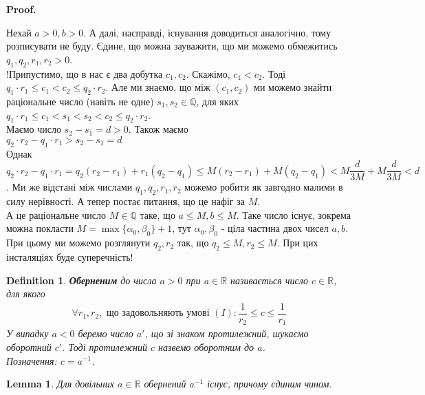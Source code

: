 \documentclass[a4paper, 14pt]{article}
\makeatletter
\def\qed{$\blacksquare$}
\theoremstyle{theoremdd}
\theoremstyle{theoremdd}
\newtheorem{definition}[theorem]{Definition}
\theoremstyle{theoremdd}
\theoremstyle{theoremdd}
\theoremstyle{theoremdd}
\theoremstyle{theoremdd}
\theoremstyle{theoremdd}
\newtheorem{lemma}[theorem]{Lemma}
\theoremstyle{theoremdd}
\renewenvironment{proof}[1][Proof.\\]{\par
\pushQED{\hfill \qed}%
\normalfont \topsep6\p@\@plus6\p@\relax
\trivlist
\item\relax
{\bfseries
#1\@addpunct{.}}\hspace\labelsep\ignorespaces
}{%
\popQED\endtrivlist\@endpefalse
}
\makeatother
\begin{document}
	\begin{proof}
	Нехай $a > 0, b > 0$. А далі, насправді, існування доводиться аналогічно, тому розписувати не буду. Єдине, що можна зауважити, що ми можемо обмежитись $q_1,q_2,r_1,r_2 > 0$.
	\bigskip \\
	!Припустимо, що в нас є два добутка $c_1, c_2$. Скажімо, $c_1 < c_2$. Тоді $q_1 \cdot r_1 \leq c_1 < c_2 \leq q_2 \cdot r_2$. Але ми знаємо, що між $(c_1, c_2)$ ми можемо знайти раціональне число (навіть не одне) $s_1,s_2 \in \mathbb{Q}$, для яких\\
	$q_1 \cdot r_1 \leq c_1 < s_1 < s_2 < c_2 \leq q_2 \cdot r_2$.\\
	Маємо число $s_2 - s_1 = d > 0$. Також маємо\\
	$q_2 \cdot r_2 - q_1 \cdot r_1 > s_2 - s_1 = d$\\
	Однак $q_2 \cdot r_2 - q_1 \cdot r_1 = q_2 (r_2 - r_1) + r_1 (q_2 - q_1) \leq M(r_2 - r_1) + M(q_2 - q_1) < M \dfrac{d}{3M} + M \dfrac{d}{3M} < d$. Ми же відстані між числами $q_1,q_2,r_1,r_2$ можемо робити як завгодно малими в силу нерівності. А тепер постає питання, що це нафіг за $M$.\\
	А це раціональне число $M \in \mathbb{Q}$ таке, що $a \leq M, b \leq M$. Таке число існує, зокрема можна покласти $M = \max \{ \alpha_0, \beta_0 \} + 1$, тут $\alpha_0, \beta_0$ - ціла частина двох чисел $a,b$. При цьому ми можемо розглянути $q_2,r_2$ так, що $q_2 \leq M, r_2 \leq M$. При цих інсталяціях буде суперечність!
	\end{proof}
	
	\begin{definition}
	\textbf{Оберненим} до числа $a > 0$ при $a \in \mathbb{R}$ називається число $c \in \mathbb{R}$, для якого
	\begin{align*}
	\forall r_1,r_2, \text{ що задовольняють умові } (I): \dfrac{1}{r_2} \leq c \leq \dfrac{1}{r_1}
	\end{align*}
	У випадку $a < 0$ беремо число $a'$, що зі знаком протилежний, шукаємо оборотний $c'$. Тоді протилежний $c$ назвемо оборотним до $a$.\\
	Позначення: $c = a^{-1}$.
	\end{definition}
	
	\begin{lemma}
	Для довільних $a \in \mathbb{R}$ обернений $a^{-1}$ існує, причому єдиним чином.
	\end{lemma}
	
\end{document}
